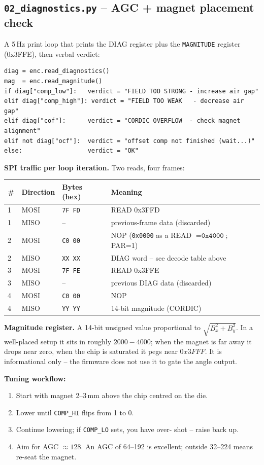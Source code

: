 \documentclass[11pt,a4paper]{article}
\begin{document}
\subsection{\texttt{02\_diagnostics.py} -- AGC + magnet placement check}
A 5\,Hz print loop that prints the DIAG register plus the
\texttt{MAGNITUDE} register (0x3FFE), then verbal verdict:
\begin{lstlisting}
diag = enc.read_diagnostics()
mag  = enc.read_magnitude()
if diag["comp_low"]:   verdict = "FIELD TOO STRONG - increase air gap"
elif diag["comp_high"]: verdict = "FIELD TOO WEAK   - decrease air gap"
elif diag["cof"]:      verdict = "CORDIC OVERFLOW  - check magnet alignment"
elif not diag["ocf"]:  verdict = "offset comp not finished (wait...)"
else:                  verdict = "OK"
\end{lstlisting}

\textbf{SPI traffic per loop iteration.}  Two reads, four frames:
\begin{center}\small
\begin{tabular}{llll}
\toprule
\# & Direction & Bytes (hex) & Meaning \\
\midrule
1 & MOSI & \texttt{7F FD} & READ 0x3FFD \\
1 & MISO & --              & previous-frame data (discarded) \\
2 & MOSI & \texttt{C0 00} & NOP (\texttt{0x0000} as a READ \(=\texttt{0x4000}\); PAR=1) \\
2 & MISO & \texttt{XX XX} & DIAG word -- see decode table above \\
3 & MOSI & \texttt{7F FE} & READ 0x3FFE \\
3 & MISO & --              & previous DIAG data (discarded) \\
4 & MOSI & \texttt{C0 00} & NOP \\
4 & MISO & \texttt{YY YY} & 14-bit magnitude (CORDIC) \\
\bottomrule
\end{tabular}
\end{center}

\textbf{Magnitude register.}  A 14-bit unsigned value proportional to
$\sqrt{B_x^2 + B_y^2}$.  In a well-placed setup it sits in roughly
$2000\!-\!4000$; when the magnet is far away it drops near zero, when
the chip is saturated it pegs near $0x3FFF$.  It is informational only
-- the firmware does not use it to gate the angle output.

\textbf{Tuning workflow:}
\begin{enumerate}
  \item Start with magnet 2--3\,mm above the chip centred on the die.
  \item Lower until \texttt{COMP\_HI} flips from 1 to 0.
  \item Continue lowering; if \texttt{COMP\_LO} sets, you have over-
        shot -- raise back up.
  \item Aim for AGC $\approx 128$.  An AGC of 64--192 is excellent;
        outside 32--224 means re-seat the magnet.
\end{enumerate}
\end{document}
